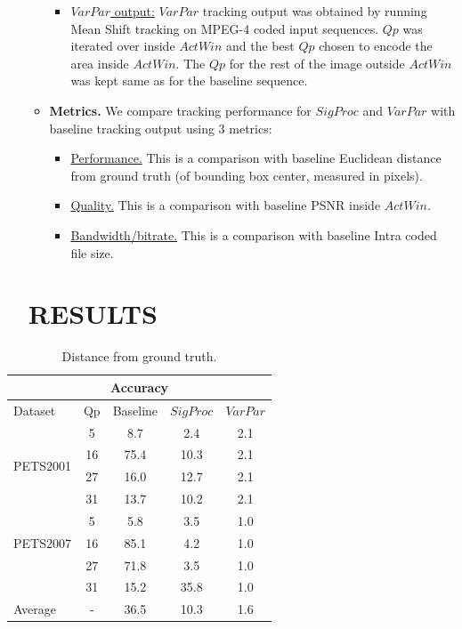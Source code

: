 \documentclass{article}
\begin{document}
\begin{itemize}
\begin{itemize}
\begin{itemize}
\item \underline{$VarPar$ output:}  $VarPar$ tracking output was obtained by running Mean Shift tracking on MPEG-4 coded input sequences.  $Qp$ was iterated over inside $ActWin$ and the best $Qp$ chosen to encode the area inside $ActWin$.  The $Qp$ for the rest of the image outside $ActWin$ was kept same as for the baseline sequence.
\end{itemize}
\item \textbf{Metrics.}  We compare tracking performance for $SigProc$ and $VarPar$ with baseline tracking output using 3 metrics:
\begin{itemize}
\item \underline{Performance.}  This is a comparison with baseline Euclidean distance from ground truth (of bounding box center, measured in pixels).
\item \underline{Quality.}  This is a comparison with baseline PSNR inside $ActWin$.
\item \underline{Bandwidth/bitrate.}  This is a comparison with baseline Intra coded file size.
\end{itemize}
\end{itemize}
\section{RESULTS}
\end{itemize}
\begin{table}
\centering
\begin{tabular}{|l|c|c|c|c|}
\hline
\multicolumn{5}{|c|}{Accuracy} \\
\hline
Dataset & Qp & Baseline & $SigProc$  & $VarPar$\\ 
\hline
\multirow{4}{*}{PETS2001} 
	&5  & 8.7 	&   2.4 &   2.1 \\
	&16 & 75.4 &  10.3 &   2.1\\
	&27 &16.0 	&  12.7 &   2.1\\
	&31 &13.7 &  10.2 &   2.1\\
\hline
\multirow{3}{*}{PETS2007} 
	&5 &5.8 &   3.5 &   1.0\\
	&16 &85.1 &   4.2 &   1.0\\
	&27 &71.8 &   3.5 &   1.0\\
	&31 &15.2 &  35.8 &   1.0\\
\hline
\multirow{1}{*}{Average}
& - & 36.5 & 10.3 & 1.6 \\  
\hline
\end{tabular}
\caption{Distance from ground truth.}
\label{tab:Accuracy}
\end{table}
\end{document}
